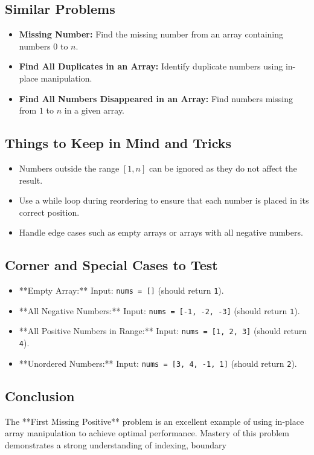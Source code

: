 \subsection*{Similar Problems}
\begin{itemize}
    \item \textbf{Missing Number:} Find the missing number from an array containing numbers \(0\) to \(n\).
    \item \textbf{Find All Duplicates in an Array:} Identify duplicate numbers using in-place manipulation.
    \item \textbf{Find All Numbers Disappeared in an Array:} Find numbers missing from \(1\) to \(n\) in a given array.
\end{itemize}

\subsection*{Things to Keep in Mind and Tricks}
\begin{itemize}
    \item Numbers outside the range \([1, n]\) can be ignored as they do not affect the result.
    \item Use a while loop during reordering to ensure that each number is placed in its correct position.
    \item Handle edge cases such as empty arrays or arrays with all negative numbers.
\end{itemize}

\subsection*{Corner and Special Cases to Test}
\begin{itemize}
    \item **Empty Array:** Input: \texttt{nums = []} (should return \texttt{1}).
    \item **All Negative Numbers:** Input: \texttt{nums = [-1, -2, -3]} (should return \texttt{1}).
    \item **All Positive Numbers in Range:** Input: \texttt{nums = [1, 2, 3]} (should return \texttt{4}).
    \item **Unordered Numbers:** Input: \texttt{nums = [3, 4, -1, 1]} (should return \texttt{2}).
\end{itemize}

\subsection*{Conclusion}
The **First Missing Positive** problem is an excellent example of using in-place array manipulation to achieve optimal performance. Mastery of this problem demonstrates a strong understanding of indexing, boundary